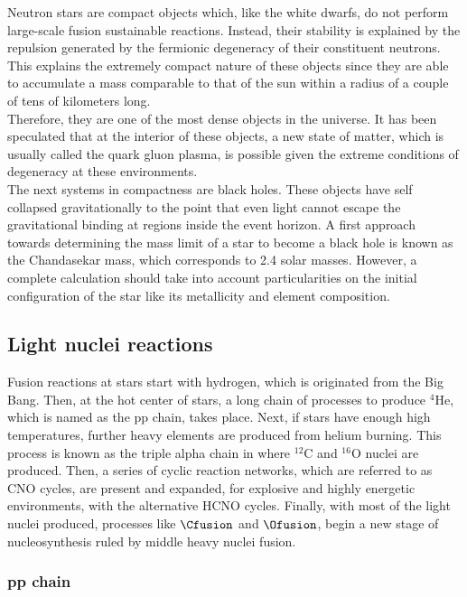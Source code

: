 \documentclass[openany]{book}
\begin{document}
Neutron stars are compact objects which, like the white dwarfs, do not perform large-scale fusion sustainable reactions. Instead, their stability is explained by the repulsion generated by the fermionic degeneracy of their constituent neutrons. This explains the extremely compact nature of these objects since they are able to accumulate a mass comparable to that of the sun within a radius of a couple of tens of kilometers long. \\ 

Therefore, they are one of the most dense objects in the universe.  It has been speculated that  at the interior of these objects, a new state of matter, which is usually called the quark gluon plasma, is possible given the extreme conditions of degeneracy at these environments.\\ 

The next systems in compactness are black holes. These objects have self collapsed gravitationally to the point that even light cannot escape the gravitational binding at regions inside the event horizon. A first approach towards determining the mass limit of a star to become a black hole is known as the Chandasekar mass, which corresponds to 2.4 solar masses. However, a complete calculation should take into account particularities on the initial configuration of the star like its metallicity and element composition.  \\

\subsection{Light nuclei reactions} \label{sub:lightReactions}

Fusion reactions at stars start with hydrogen, which is originated from the Big Bang. Then, at the hot center of stars, a long chain of processes to produce $\mathrm{{}^{4}He}$, which is named as the pp chain, takes place.  Next, if stars have enough high temperatures, further heavy elements are produced from helium burning. This process is known as the triple alpha chain in where $\mathrm{{}^{12}C}$ and $\mathrm{{}^{16}O}$ nuclei are produced. Then, a series of cyclic reaction networks, which are referred to as CNO cycles, are present and expanded, for explosive and highly energetic environments, with the alternative  HCNO cycles. Finally, with most of the light nuclei produced, processes like $\Cfusion$ and $\Ofusion$, begin a new stage of nucleosynthesis ruled by middle heavy nuclei fusion.

\subsubsection{pp chain}
\end{document}
